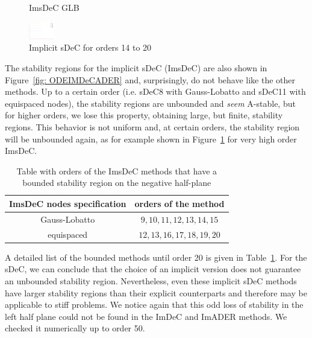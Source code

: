 \begin{figure}
\begin{minipage}[t]{0.33\textwidth}
		ImsDeC GLB
	\end{minipage}
	\includegraphics[width=0.1\textwidth, trim={491 230 30 23}, clip]{pdf/odepics/colors_a-d_new_14-20_no_order.pdf}
	\caption{Implicit sDeC for orders 14 to 20}
	\label{fig: exaImsDeC_high}
\end{figure}
The stability regions for the implicit sDeC (ImsDeC) are also shown in Figure~\ref{fig: ODEIMDeCADER} and, surprisingly, do not behave like the other methods. 
Up to a certain order (i.e. sDeC8 with Gauss-Lobatto and sDeC11 with equispaced nodes), the stability regions are unbounded and \textit{seem} A-stable, but for higher orders, we lose this property, obtaining large, but finite, stability regions. 
This behavior is not uniform and, at certain orders, the stability region will be unbounded again, as for example shown in Figure~\ref{fig: exaImsDeC_high} for very high order ImsDeC. 


\begin{table}
	\centering
	\caption{Table with orders of the ImsDeC methods that have a bounded stability region on the negative half-plane}
	\label{tab:imsDeC_bounded}
	\begin{tabular}[h]{|c|c|}
		\hline
		ImsDeC nodes specification & orders of the method\\
		\hline
		Gauss-Lobatto & $9, 10, 11, 12, 13, 14, 15 $\\
		\hline	equispaced & $12, 13, 16, 17, 18, 19, 20 $\\
		\hline
	\end{tabular}
\end{table}
A detailed list of the bounded methods until order 20 is given in Table~\ref{tab:imsDeC_bounded}. 
For the sDeC, we can conclude that the choice of an implicit version does not guarantee an unbounded stability region. Nevertheless, even these implicit sDeC methods have larger stability regions than their explicit counterparts and therefore may be applicable to stiff problems. 
We notice again that this odd loss of stability in the left half plane could not be found in the ImDeC and ImADER methods. We checked it numerically up to order 50.




